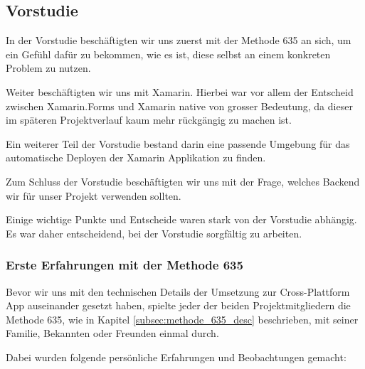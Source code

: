 \subsection{Vorstudie}
\label{vorstudie}
In der Vorstudie beschäftigten wir uns zuerst mit der Methode 635 an sich, um ein Gefühl dafür zu bekommen, wie es ist, diese selbst an einem konkreten Problem zu nutzen. 

Weiter beschäftigten wir uns mit Xamarin. Hierbei war vor allem der Entscheid zwischen Xamarin.Forms und Xamarin native von grosser Bedeutung, da dieser im späteren Projektverlauf kaum mehr rückgängig zu machen ist.

Ein weiterer Teil der Vorstudie bestand darin eine passende Umgebung  für das automatische Deployen der Xamarin Applikation zu finden. 

Zum Schluss der Vorstudie beschäftigten wir uns mit der Frage, welches Backend wir für unser Projekt verwenden sollten.

Einige wichtige Punkte und Entscheide waren stark von der Vorstudie abhängig. Es war daher entscheidend, bei der Vorstudie sorgfältig zu arbeiten.


\subsubsection{Erste Erfahrungen mit der Methode 635} \label{subsub:erste_erfahrungen_mit_methode_635}
Bevor wir uns mit den technischen Details der Umsetzung zur Cross-Plattform App auseinander gesetzt haben, spielte jeder der beiden Projektmitgliedern die Methode 635, wie in Kapitel \ref{subsec:methode_635_desc} beschrieben, mit seiner Familie, Bekannten oder Freunden einmal durch. 

Dabei wurden folgende persönliche Erfahrungen und Beobachtungen gemacht:

